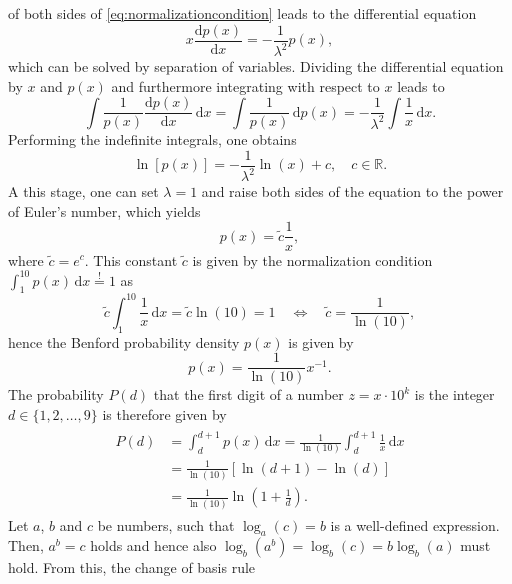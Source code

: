 \documentclass[a4paper,11pt, twocolumn]{article}
\begin{document}
of both sides of \cref{eq:normalizationcondition} leads to the differential equation \begin{equation}
	x\frac{\mathrm{d}p(x)}{\mathrm{d}x} = -\frac{1}{\lambda^2}p(x),
\end{equation} which can be solved by separation of variables. Dividing the differential equation by $x$ and $p(x)$ and furthermore integrating with respect to $x$ leads to \begin{equation}
\int \frac{1}{p(x)}\frac{\mathrm{d}p(x)}{\mathrm{d}x}\,\mathrm{d}x = \int \frac{1}{p(x)}\,\mathrm{d}p(x) =  -\frac{1}{\lambda^2}\int \frac{1}{x}\,\mathrm{d}x.
\end{equation} Performing the indefinite integrals, one obtains \begin{equation}
\ln[p(x)] = -\frac{1}{\lambda^2}\ln(x) + c, \quad c \in \mathbb{R}.
\end{equation} A this stage, one can set $\lambda =1$ and raise both sides of the equation to the power of Euler's number, which yields \begin{equation}
p(x) = \tilde{c}\frac{1}{x},
\end{equation} where $\tilde{c} = e^c$. This constant $\tilde{c}$ is given by the normalization condition $\int_{1}^{10}p(x)\,\mathrm{d}x\overset{!}{=}1$ as \begin{equation}
\tilde{c}\int_{1}^{10}\frac{1}{x}\,\mathrm{d}x = \tilde{c}\ln(10) = 1 \quad \Leftrightarrow \quad \tilde{c} = \frac{1}{\ln(10)},
\end{equation} hence the Benford probability density $p(x)$ is given by \begin{equation}
p(x) = \frac{1}{\ln(10)}x^{-1}.
\end{equation} The probability $P(d)$ that the first digit of a number $z = x\cdot 10^k$ is the integer $d \in \{1,2,\dots,9\}$ is therefore given by \begin{align}\begin{aligned}
P(d) &= \int_{d}^{d+1}p(x)\,\mathrm{d}x = \frac{1}{\ln(10)}\int_{d}^{d+1}\frac{1}{x}\,\mathrm{d}x \\ &= \frac{1}{\ln(10)}[\ln(d+1)-\ln(d)] \\ &= \frac{1}{\ln(10)}\ln\left(1+\frac{1}{d}\right).
\end{aligned}\end{align} Let $a$, $b$ and $c$ be numbers, such that $\log_a(c) = b$ is a well-defined expression. Then, $a^b = c$ holds and hence also $\log_b(a^b) = \log_b(c) = b\log_b(a)$ must hold. From this, the change of basis rule \begin{equation}

\end{equation}
\end{document}
